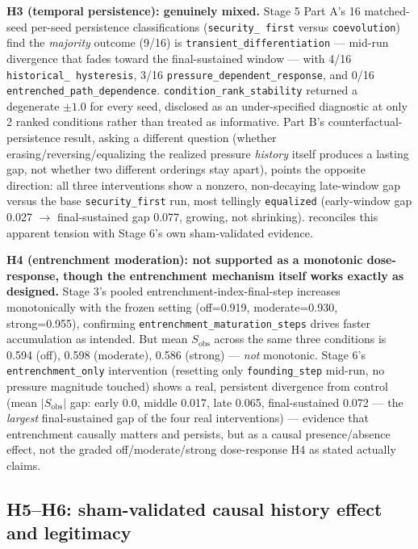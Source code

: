 \textbf{H3 (temporal persistence): genuinely mixed.} Stage 5 Part A's 16
matched-seed per-seed persistence classifications (\texttt{security\_%
first} versus \texttt{coevolution}) find the \textit{majority} outcome
(9/16) is \texttt{transient\_differentiation} --- mid-run divergence that
fades toward the final-sustained window --- with 4/16 \texttt{historical\_%
hysteresis}, 3/16 \texttt{pressure\_dependent\_response}, and 0/16
\texttt{entrenched\_path\_dependence}. \texttt{condition\_rank\_stability}
returned a degenerate $\pm1.0$ for every seed, disclosed as an
under-specified diagnostic at only 2 ranked conditions rather than treated
as informative. Part B's counterfactual-persistence result, asking a
different question (whether erasing/reversing/equalizing the realized
pressure \textit{history} itself produces a lasting gap, not whether two
different orderings stay apart), points the opposite direction: all three
interventions show a nonzero, non-decaying late-window gap versus the base
\texttt{security\_first} run, most tellingly \texttt{equalized} (early-window
gap 0.027 $\to$ final-sustained gap 0.077, growing, not shrinking).
 reconciles this apparent tension with Stage 6's
own sham-validated evidence.

\textbf{H4 (entrenchment moderation): not supported as a monotonic
dose-response, though the entrenchment mechanism itself works exactly as
designed.} Stage 3's pooled entrenchment-index-final-step increases
monotonically with the frozen setting (off=0.919, moderate=0.930,
strong=0.955), confirming \texttt{entrenchment\_maturation\_steps} drives
faster accumulation as intended. But mean $S_{\text{obs}}$ across the same
three conditions is 0.594 (off), 0.598 (moderate), 0.586 (strong) ---
\textit{not} monotonic. Stage 6's \texttt{entrenchment\_only} intervention
(resetting only \texttt{founding\_step} mid-run, no pressure magnitude
touched) shows a real, persistent divergence from control (mean
$|S_{\text{obs}}|$ gap: early 0.0, middle 0.017, late 0.065, final-sustained
0.072 --- the \textit{largest} final-sustained gap of the four real
interventions) --- evidence that entrenchment causally matters and
persists, but as a causal presence/absence effect, not the graded
off/moderate/strong dose-response H4 as stated actually claims.

\subsection{H5--H6: sham-validated causal history effect and legitimacy}
\label{sec:level13b-h5h6}

